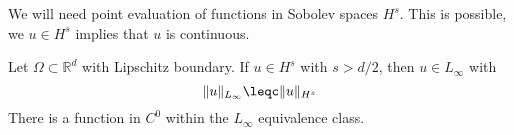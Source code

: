 \bigskip


We will need point evaluation of functions in Sobolev spaces $H^s$. This is
possible, we $u \in H^s$ implies that $u$ is continuous. 
\begin{theorem} Let $\Omega \subset {\mathbb R}^d$ with Lipschitz boundary. If $u \in H^s$ with $s > d/2$, then $u \in L_\infty$
with
$$
\| u \|_{L_\infty} \leqc \| u \|_{H^s}
$$
There is a function in $C^0$ within the $L_\infty$ equivalence class.
\end{theorem}



